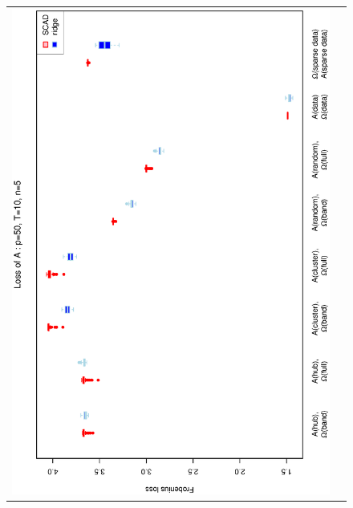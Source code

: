 \documentclass[a4paper]{article}
\begin{document}
\begin{figure}[h!]
\centering
\begin{tabular}{cc}
\includegraphics[scale=0.5,angle=270]{LossA50T10N5.eps}\\

\end{tabular}
\end{figure}
\end{document}
